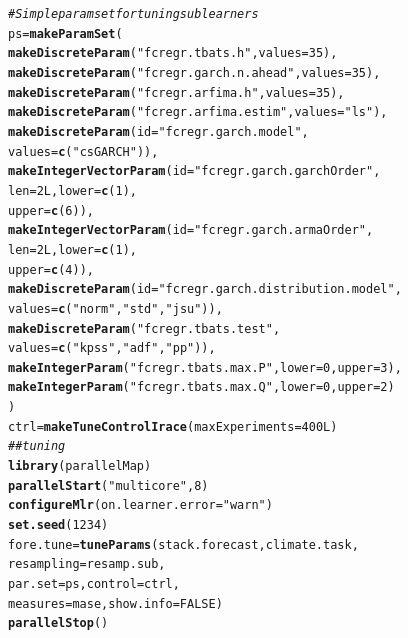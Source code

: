\documentclass[12pt]{article}\usepackage[]{graphicx}\usepackage[]{color}
\makeatletter
\newcommand{\hlnum}[1]{\textcolor[rgb]{0.686,0.059,0.569}{#1}}%
\newcommand{\hlstr}[1]{\textcolor[rgb]{0.192,0.494,0.8}{#1}}%
\newcommand{\hlcom}[1]{\textcolor[rgb]{0.678,0.584,0.686}{\textit{#1}}}%
\newcommand{\hlstd}[1]{\textcolor[rgb]{0.345,0.345,0.345}{#1}}%
\newcommand{\hlkwb}[1]{\textcolor[rgb]{0.69,0.353,0.396}{#1}}%
\newcommand{\hlkwc}[1]{\textcolor[rgb]{0.333,0.667,0.333}{#1}}%
\newcommand{\hlkwd}[1]{\textcolor[rgb]{0.737,0.353,0.396}{\textbf{#1}}}%
\newenvironment{kframe}{%
 \def\at@end@of@kframe{}%
 \ifinner\ifhmode%
  \def\at@end@of@kframe{\end{minipage}}%
  \begin{minipage}{\columnwidth}%
 \fi\fi%
 \def\FrameCommand##1{\hskip\@totalleftmargin \hskip-\fboxsep
 \colorbox{shadecolor}{##1}\hskip-\fboxsep
     \hskip-\linewidth \hskip-\@totalleftmargin \hskip\columnwidth}%
 \MakeFramed {\advance\hsize-\width
   \@totalleftmargin\z@ \linewidth\hsize
   \@setminipage}}%
 {\par\unskip\endMakeFramed%
 \at@end@of@kframe}
\newenvironment{knitrout}{}{} %
\theoremstyle{definition}
\makeatother
\begin{document}
\singlespacing
\begin{knitrout}
\color{fgcolor}\begin{kframe}
\begin{alltt}
\hlcom{# Simple param set for tuning sub learners}
\hlstd{ps} \hlkwb{=} \hlkwd{makeParamSet}\hlstd{(}
  \hlkwd{makeDiscreteParam}\hlstd{(}\hlstr{"fcregr.tbats.h"}\hlstd{,} \hlkwc{values} \hlstd{=} \hlnum{35}\hlstd{),}
  \hlkwd{makeDiscreteParam}\hlstd{(}\hlstr{"fcregr.garch.n.ahead"}\hlstd{,} \hlkwc{values} \hlstd{=} \hlnum{35}\hlstd{),}
  \hlkwd{makeDiscreteParam}\hlstd{(}\hlstr{"fcregr.arfima.h"}\hlstd{,} \hlkwc{values} \hlstd{=} \hlnum{35}\hlstd{),}
  \hlkwd{makeDiscreteParam}\hlstd{(}\hlstr{"fcregr.arfima.estim"}\hlstd{,} \hlkwc{values} \hlstd{=} \hlstr{"ls"}\hlstd{),}
  \hlkwd{makeDiscreteParam}\hlstd{(}\hlkwc{id} \hlstd{=} \hlstr{"fcregr.garch.model"}\hlstd{,}
                    \hlkwc{values} \hlstd{=} \hlkwd{c}\hlstd{(}\hlstr{"csGARCH"}\hlstd{)),}
  \hlkwd{makeIntegerVectorParam}\hlstd{(}\hlkwc{id} \hlstd{=} \hlstr{"fcregr.garch.garchOrder"}\hlstd{,}
                         \hlkwc{len} \hlstd{=} \hlnum{2L}\hlstd{,} \hlkwc{lower} \hlstd{=} \hlkwd{c}\hlstd{(}\hlnum{1}\hlstd{),}
                         \hlkwc{upper} \hlstd{=} \hlkwd{c}\hlstd{(}\hlnum{6}\hlstd{)),}
  \hlkwd{makeIntegerVectorParam}\hlstd{(}\hlkwc{id} \hlstd{=} \hlstr{"fcregr.garch.armaOrder"}\hlstd{,}
                         \hlkwc{len} \hlstd{=} \hlnum{2L}\hlstd{,} \hlkwc{lower} \hlstd{=} \hlkwd{c}\hlstd{(}\hlnum{1}\hlstd{),}
                         \hlkwc{upper} \hlstd{=} \hlkwd{c}\hlstd{(}\hlnum{4}\hlstd{)),}
  \hlkwd{makeDiscreteParam}\hlstd{(}\hlkwc{id} \hlstd{=} \hlstr{"fcregr.garch.distribution.model"}\hlstd{,}
                    \hlkwc{values} \hlstd{=} \hlkwd{c}\hlstd{(}\hlstr{"norm"}\hlstd{,}\hlstr{"std"}\hlstd{,}\hlstr{"jsu"}\hlstd{)),}
  \hlkwd{makeDiscreteParam}\hlstd{(}\hlstr{"fcregr.tbats.test"}\hlstd{,}
                    \hlkwc{values} \hlstd{=} \hlkwd{c}\hlstd{(}\hlstr{"kpss"}\hlstd{,}\hlstr{"adf"}\hlstd{,}\hlstr{"pp"}\hlstd{)),}
  \hlkwd{makeIntegerParam}\hlstd{(}\hlstr{"fcregr.tbats.max.P"}\hlstd{,} \hlkwc{lower} \hlstd{=} \hlnum{0}\hlstd{,} \hlkwc{upper} \hlstd{=} \hlnum{3}\hlstd{),}
  \hlkwd{makeIntegerParam}\hlstd{(}\hlstr{"fcregr.tbats.max.Q"}\hlstd{,} \hlkwc{lower} \hlstd{=} \hlnum{0}\hlstd{,} \hlkwc{upper} \hlstd{=} \hlnum{2}\hlstd{)}
\hlstd{)}
\hlstd{ctrl} \hlkwb{=} \hlkwd{makeTuneControlIrace}\hlstd{(}\hlkwc{maxExperiments} \hlstd{=} \hlnum{400L}\hlstd{)}
\hlcom{## tuning}
\hlkwd{library}\hlstd{(parallelMap)}
\hlkwd{parallelStart}\hlstd{(}\hlstr{"multicore"}\hlstd{,}\hlnum{8}\hlstd{)}
\hlkwd{configureMlr}\hlstd{(}\hlkwc{on.learner.error} \hlstd{=} \hlstr{"warn"}\hlstd{)}
\hlkwd{set.seed}\hlstd{(}\hlnum{1234}\hlstd{)}
\hlstd{fore.tune} \hlkwb{=} \hlkwd{tuneParams}\hlstd{(stack.forecast, climate.task,}
                       \hlkwc{resampling} \hlstd{= resamp.sub,}
                       \hlkwc{par.set} \hlstd{= ps,} \hlkwc{control} \hlstd{= ctrl,}
                       \hlkwc{measures} \hlstd{= mase,} \hlkwc{show.info} \hlstd{=} \hlnum{FALSE}\hlstd{)}
\hlkwd{parallelStop}\hlstd{()}
\end{alltt}
\end{kframe}
\end{knitrout}
\end{document}
